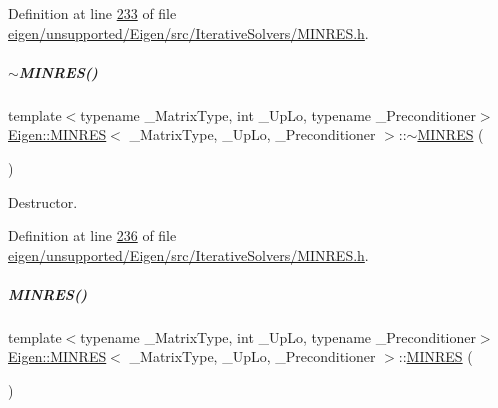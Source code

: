 Definition at line \hyperlink{eigen_2unsupported_2_eigen_2src_2_iterative_solvers_2_m_i_n_r_e_s_8h_source_l00233}{233} of file \hyperlink{eigen_2unsupported_2_eigen_2src_2_iterative_solvers_2_m_i_n_r_e_s_8h_source}{eigen/unsupported/\+Eigen/src/\+Iterative\+Solvers/\+M\+I\+N\+R\+E\+S.\+h}.

\mbox{\label{group___iterative_linear_solvers___module_a3f40ba58caac8b10ae7df474af93a05b}} 
\subparagraph{\texorpdfstring{$\sim$\+M\+I\+N\+R\+E\+S()}{~MINRES()}\hspace{0.1cm}{\footnotesize\ttfamily [1/2]}}
{\footnotesize\ttfamily template$<$typename \+\_\+\+Matrix\+Type, int \+\_\+\+Up\+Lo, typename \+\_\+\+Preconditioner$>$ \\
\hyperlink{group___iterative_linear_solvers___module_class_eigen_1_1_m_i_n_r_e_s}{Eigen\+::\+M\+I\+N\+R\+ES}$<$ \+\_\+\+Matrix\+Type, \+\_\+\+Up\+Lo, \+\_\+\+Preconditioner $>$\+::$\sim$\hyperlink{group___iterative_linear_solvers___module_class_eigen_1_1_m_i_n_r_e_s}{M\+I\+N\+R\+ES} (\begin{DoxyParamCaption}{ }\end{DoxyParamCaption})\hspace{0.3cm}{\ttfamily [inline]}}

Destructor. 

Definition at line \hyperlink{eigen_2unsupported_2_eigen_2src_2_iterative_solvers_2_m_i_n_r_e_s_8h_source_l00236}{236} of file \hyperlink{eigen_2unsupported_2_eigen_2src_2_iterative_solvers_2_m_i_n_r_e_s_8h_source}{eigen/unsupported/\+Eigen/src/\+Iterative\+Solvers/\+M\+I\+N\+R\+E\+S.\+h}.

\mbox{\label{group___iterative_linear_solvers___module_aa519021be1178a99f5f9ec633de9fc09}} 
\subparagraph{\texorpdfstring{M\+I\+N\+R\+E\+S()}{MINRES()}\hspace{0.1cm}{\footnotesize\ttfamily [3/4]}}
{\footnotesize\ttfamily template$<$typename \+\_\+\+Matrix\+Type, int \+\_\+\+Up\+Lo, typename \+\_\+\+Preconditioner$>$ \\
\hyperlink{group___iterative_linear_solvers___module_class_eigen_1_1_m_i_n_r_e_s}{Eigen\+::\+M\+I\+N\+R\+ES}$<$ \+\_\+\+Matrix\+Type, \+\_\+\+Up\+Lo, \+\_\+\+Preconditioner $>$\+::\hyperlink{group___iterative_linear_solvers___module_class_eigen_1_1_m_i_n_r_e_s}{M\+I\+N\+R\+ES} (\begin{DoxyParamCaption}{ }\end{DoxyParamCaption})\hspace{0.3cm}{\ttfamily [inline]}}

